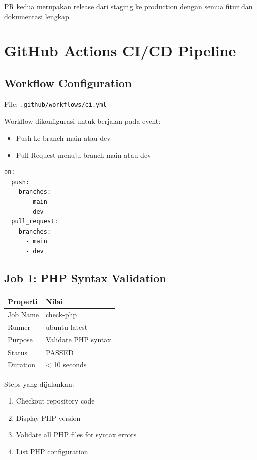 \documentclass[a4paper,oneside,11pt]{book}
\begin{document}
PR kedua merupakan release dari staging ke production dengan semua fitur dan dokumentasi lengkap.

\newpage

\section{GitHub Actions CI/CD Pipeline}

\subsection{Workflow Configuration}

File: \texttt{.github/workflows/ci.yml}

Workflow dikonfigurasi untuk berjalan pada event:
\begin{itemize}
    \item Push ke branch main atau dev
    \item Pull Request menuju branch main atau dev
\end{itemize}

\begin{lstlisting}[style=yamlStyle, caption={GitHub Actions Trigger Events}, label={kode:triggers}]
on:
  push:
    branches:
      - main
      - dev
  pull_request:
    branches:
      - main
      - dev
\end{lstlisting}

\subsection{Job 1: PHP Syntax Validation}

\begin{center}
\begin{tabular}{|l|l|}
\hline
\textbf{Properti} & \textbf{Nilai} \\
\hline
Job Name & check-php \\
\hline
Runner & ubuntu-latest \\
\hline
Purpose & Validate PHP syntax \\
\hline
Status & PASSED \\
\hline
Duration & < 10 seconds \\
\hline
\end{tabular}
\end{center}

Steps yang dijalankan:
\begin{enumerate}
    \item Checkout repository code
    \item Display PHP version
    \item Validate all PHP files for syntax errors
    \item List PHP configuration
\end{enumerate}
\end{document}
